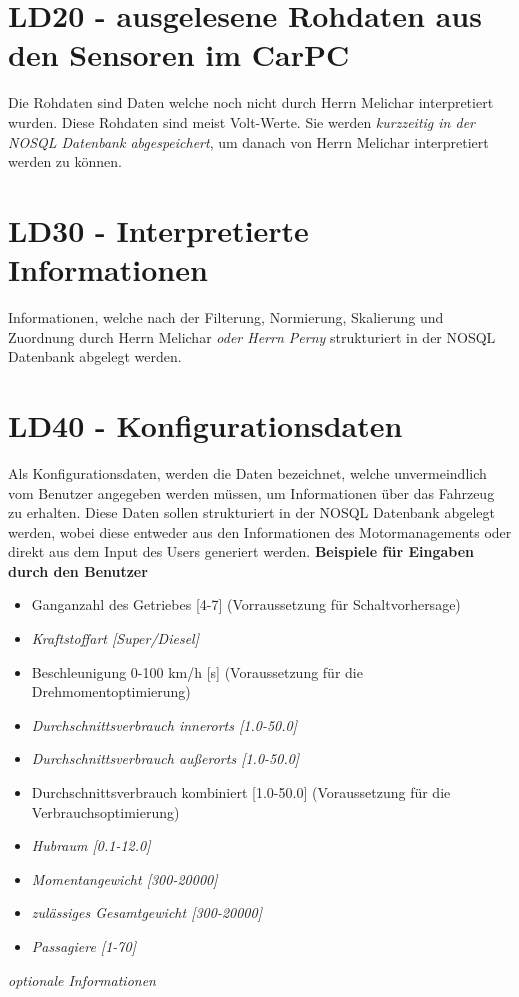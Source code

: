 \section{LD20 - ausgelesene Rohdaten aus den Sensoren im CarPC}
Die Rohdaten sind Daten welche noch nicht durch Herrn Melichar interpretiert wurden. Diese Rohdaten sind meist Volt-Werte. Sie werden \textit{kurzzeitig in der NOSQL Datenbank abgespeichert}, um danach von Herrn Melichar interpretiert werden zu können.

\section{LD30 - Interpretierte Informationen}
Informationen, welche nach der Filterung, Normierung, Skalierung und Zuordnung durch Herrn Melichar \textit{oder Herrn Perny} strukturiert in der NOSQL Datenbank abgelegt werden.

\section{LD40 - Konfigurationsdaten}
Als Konfigurationsdaten, werden die Daten bezeichnet, welche unvermeindlich vom Benutzer angegeben werden müssen, um Informationen über das Fahrzeug zu erhalten.   Diese Daten sollen strukturiert in der NOSQL Datenbank abgelegt werden, wobei diese entweder aus den Informationen des Motormanagements oder direkt aus dem Input des Users generiert werden.
\nextline
\textbf{Beispiele für Eingaben durch den Benutzer}
\begin{itemize}
	\item Ganganzahl des Getriebes [4-7] (Vorraussetzung für Schaltvorhersage)
	\item \textit{Kraftstoffart [Super/Diesel]}
	\item Beschleunigung 0-100 km/h [s] (Voraussetzung für die Drehmomentoptimierung)
	\item \textit{Durchschnittsverbrauch innerorts [1.0-50.0]} 
	\item \textit{Durchschnittsverbrauch außerorts [1.0-50.0]}	
	\item Durchschnittsverbrauch kombiniert [1.0-50.0] (Voraussetzung für die Verbrauchsoptimierung)
	\item \textit{Hubraum [0.1-12.0]}
	\item \textit{Momentangewicht [300-20000]}
	\item \textit{zulässiges Gesamtgewicht [300-20000]}
	\item \textit{Passagiere [1-70]}
\end{itemize}
\textit{optionale Informationen}

